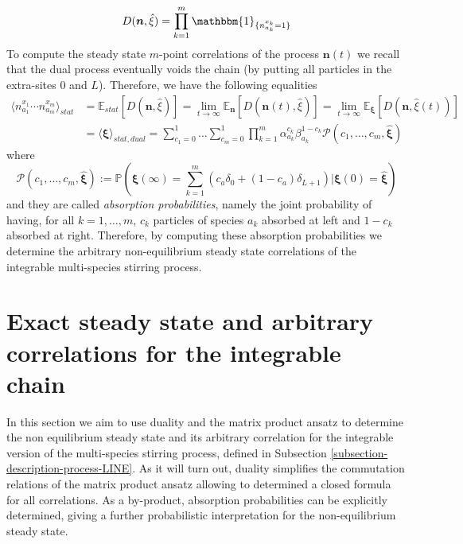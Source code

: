 \documentclass[10pt]{article}
\numberwithin{equation}{section}
\numberwithin{equation}{subsection}
\begin{document}
\begin{equation}
	D(\bm{n},\hat{\xi})=\prod_{k=1}^{m}\mathbbm{1}_{\{n_{a_{k}}^{x_{k}}=1\}}
\end{equation}
To compute the steady state $m$-point correlations of the process $\bm{n}(t)$ we recall that the dual process eventually voids the chain (by putting all particles in the extra-sites $0$ and $L$). Therefore, we have the following equalities
\begin{equation}\label{CorrelationByABS-prob}
	\begin{split}
	\langle n_{a_{1}}^{x_{1}}\cdots n_{a_{m}}^{x_{m}}\rangle_{stat}&=\mathbb{E}_{stat}\left[D(\bm{n},\hat{\xi})\right]=\lim_{t\to \infty}\mathbb{E}_{\bm{n}}\left[D(\bm{n}(t),\hat{\xi})\right]=\lim_{t\to \infty}\mathbb{E}_{\bm{\xi}}\left[D(\bm{n},\hat{\xi}(t))\right]
	\\&=\langle\hat{\bm{\xi}}\rangle_{stat,dual}=\sum_{c_{1}=0}^{1}\ldots \sum_{c_{m}=0}^{1}\prod_{k=1}^{m}\alpha_{a_{k}}^{c_{k}}\beta_{a_{k}}^{1-c_{k}}\mathcal{P}(c_{1},\ldots,c_{m},\hat{\bm{\xi}})
\end{split}
\end{equation}
where
\begin{equation}\label{absProbabilitiesIntegrable}
	\mathcal{P}(c_{1},\ldots,c_{m},\hat{\bm{\xi}}):=\mathbb{P}\left(\bm{\xi}(\infty)=\sum_{k=1}^{m}\left(c_{a}\delta_{0}+(1-c_{a})\delta_{L+1}\right)| \bm{\xi}(0)=\hat{\bm{\xi}}\right)
\end{equation}
and they are called \textit{absorption probabilities}, namely the joint probability of having, for all $k=1,\ldots,m$, $c_{k}$ particles of species $a_{k}$ absorbed at left and $1-c_{k}$ absorbed at right. Therefore, by computing these absorption probabilities we determine the arbitrary non-equilibrium steady state correlations of the integrable multi-species stirring process. 






\section{Exact steady state and arbitrary correlations for the integrable chain}\label{sectionIntegrabiliy}
In this section we aim to use duality and the matrix product ansatz to determine the non equilibrium steady state and its arbitrary correlation for the integrable version of the multi-species stirring process, defined in Subsection \ref{subsection-description-process-LINE}. As it will turn out, duality simplifies the commutation relations of the matrix product ansatz allowing to determined a closed formula for all correlations. As a by-product, absorption probabilities can be explicitly determined, giving a further probabilistic interpretation for the non-equilibrium steady state. 
\end{document}
